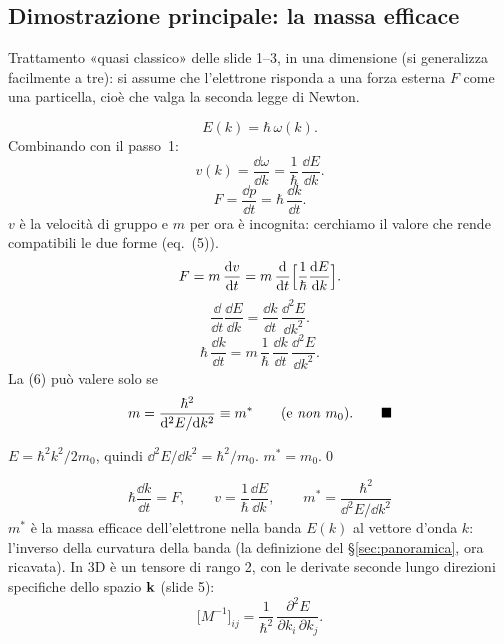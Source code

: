 \documentclass[11pt,a4paper]{article}
\begin{document}
\subsection{Dimostrazione principale: la massa efficace}\label{sec:massaeff}
Trattamento «quasi classico» delle slide 1--3, in una dimensione (si generalizza facilmente a tre): si assume che l'elettrone risponda a una forza
esterna $F$ come una particella, cioè che valga la seconda legge di Newton.
\begin{dimostrazione}
\[
E(k)=\hbar\,\omega(k).
\]
Combinando con il passo~1:
\[
v(k)=\frac{\dd\omega}{\dd k}=\frac1\hbar\,\frac{\dd E}{\dd k}.
\]
\[
F=\frac{\dd p}{\dd t}=\hbar\,\frac{\dd k}{\dd t}.
\]
$v$ è la velocità di gruppo e $m$ per ora è incognita: cerchiamo il valore che rende compatibili le due forme (eq.~(5)).
\[
F=m\,\frac{\mathrm d v}{\mathrm d t}=m\,\frac{\mathrm d}{\mathrm d t}\Bigl[\frac1\hbar\frac{\mathrm d E}{\mathrm d k}\Bigr].
\]
\[
\frac{\dd}{\dd t}\frac{\dd E}{\dd k}=\frac{\dd k}{\dd t}\,\frac{\dd^2E}{\dd k^2}.
\]
\[
\hbar\,\frac{\dd k}{\dd t}=m\,\frac1\hbar\,\frac{\dd k}{\dd t}\,\frac{\dd^2E}{\dd k^2}.
\]
La (6) può valere solo se
\[
m=\frac{\hbar^2}{\dd^2E/\dd k^2}\equiv m^*\qquad(\text{e \emph{non} }m_0).\qed
\]
\end{dimostrazione}

\begin{dimostrazione}
$E=\hbar^2k^2/2m_0$, quindi $\dd^2E/\dd k^2=\hbar^2/m_0$.
$m^*=m_0$.\qed
\end{dimostrazione}

\begin{chiave}
\[
\boxed{\ \hbar\frac{\dd k}{\dd t}=F,\qquad v=\frac1\hbar\frac{\dd E}{\dd k},\qquad m^*=\frac{\hbar^2}{\dd^2E/\dd k^2}\ }
\]
$m^*$ è la massa efficace dell'elettrone nella banda $E(k)$ al vettore d'onda $k$: l'inverso della curvatura della banda (la definizione del
§\ref{sec:panoramica}, ora ricavata). In 3D è un tensore di rango 2, con le derivate seconde lungo direzioni specifiche dello spazio $\mathbf k$ (slide 5):
\[
\bigl[M^{-1}\bigr]_{ij}=\frac1{\hbar^2}\,\frac{\partial^2E}{\partial k_i\,\partial k_j}.
\]
\end{chiave}
\end{document}
